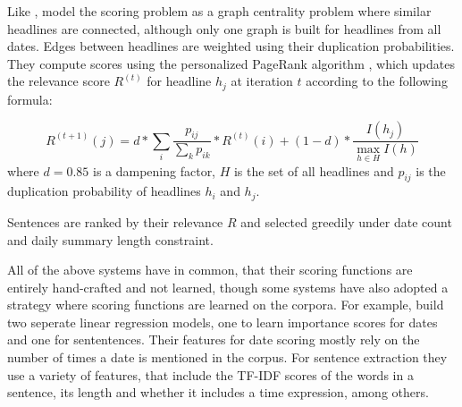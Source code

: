 \documentclass[a4paper,BCOR=10mm]{report}
\numberwithin{lemma}{chapter}
\numberwithin{definition}{chapter}
\begin{document}
Like \citet{yan-trans}, \citet{tran-headlines} model the scoring problem as a graph centrality problem where similar headlines are connected, although only one graph is built for headlines from all dates.
Edges between headlines are weighted using their duplication probabilities.
They compute scores using the personalized PageRank algorithm \citep{topic-sensitive-pagerank}, which updates the relevance score $R^{(t)}$ for headline $h_j$ at iteration $t$ according to the following formula:

\begin{equation}
R^{(t + 1)}(j) = d * \sum_{i} \frac{p_{ij}}{\sum_{k} p_{ik}} * R^{(t)}(i) + (1 - d) * \frac{I(h_j)}{\max_{h \in H} I(h)}
\end{equation}
where $d = 0.85$ is a dampening factor, $H$ is the set of all headlines and $p_{ij}$ is the duplication probability of headlines $h_i$ and $h_j$.

Sentences are ranked by their relevance $R$ and selected greedily under date count and daily summary length constraint.





All of the above systems have in common, that their scoring functions are entirely hand-crafted and not learned, though some systems have also adopted a strategy where scoring functions are learned on the corpora.
For example, \citet{tran-headlines} build two seperate linear regression models, one to learn importance scores for dates and one for sententences.
Their features for date scoring mostly rely on the number of times a date is mentioned in the corpus.
For sentence extraction they use a variety of features, that include the TF-IDF scores of the words in a sentence, its length and whether it includes a time expression, among others.
\end{document}
